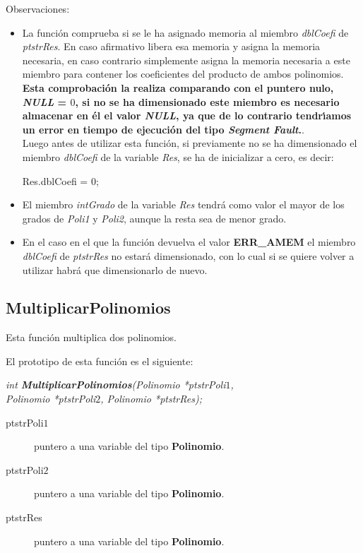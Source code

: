 Observaciones:

\begin{itemize}
\item La funci\'on comprueba si se le ha asignado memoria al miembro 
\emph{dblCoefi} de \emph{ptstrRes}. En caso afirmativo libera esa
memoria y asigna la memoria necesaria, en caso contrario simplemente asigna
la memoria necesaria a este miembro para contener los coeficientes del
producto de ambos polinomios.\\

\textbf{Esta comprobaci\'on la realiza comparando con el puntero nulo, 
\emph{NULL} = $0$, si no se ha dimensionado este miembro es necesario almacenar
en \'el el valor \emph{NULL}, ya que de lo contrario tendr\'{\i}amos un error
en tiempo de ejecuci\'on del tipo \emph{Segment Fault}.}.\\

Luego antes de utilizar esta funci\'on, si previamente no se ha dimensionado
el miembro \emph{dblCoefi} de la variable \emph{Res}, se ha de inicializar
a cero, es decir:

\begin{center}
Res.dblCoefi = 0;
\end{center}
\item El miembro \emph{intGrado} de la variable \emph{Res} tendr\'a como
valor el mayor de los grados de \emph{Poli1} y \emph{Poli2}, aunque la resta
sea de menor grado.
\item En el caso en el que la funci\'on devuelva el valor \textbf{ERR\_AMEM} el
miembro \emph{dblCoefi} de \emph{ptstrRes} no estar\'a dimensionado, con lo
cual si se quiere volver a utilizar habr\'a que dimensionarlo de nuevo.
\end{itemize}

\subsection{MultiplicarPolinomios}

Esta funci\'on multiplica dos polinomios.\newline

El prototipo de esta funci\'on es el siguiente:

\begin{center}
\emph{int \textbf{MultiplicarPolinomios}(Polinomio *ptstrPoli$1$,\\
Polinomio *ptstrPoli$2$, Polinomio *ptstrRes);}
\end{center}

\begin{description}
\item[ptstrPoli$1$] puntero a una variable del tipo \textbf{Polinomio}. 
\item[ptstrPoli$2$] puntero a una variable del tipo \textbf{Polinomio}. 
\item[ptstrRes] puntero a una variable del tipo \textbf{Polinomio}.
\end{description}

